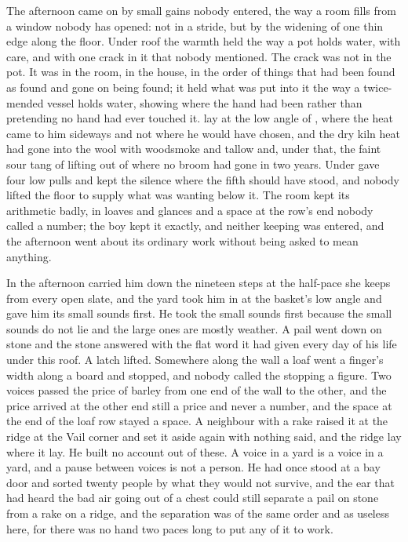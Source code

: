 The afternoon came on by small gains nobody entered, the way a room fills from a window nobody has opened: not in a stride, but by the widening of one thin edge along the floor. Under  roof the warmth held the way a pot holds water, with care, and with one crack in it that nobody mentioned. The crack was not in the pot. It was in the room, in the house, in the order of things that had been found as found and gone on being found; it held what was put into it the way a twice-mended vessel holds water, showing where the hand had been rather than pretending no hand had ever touched it.  lay at the low angle of , where the heat came to him sideways and not where he would have chosen, and the dry kiln heat had gone into the wool with woodsmoke and tallow and, under that, the faint sour tang of  lifting out of  where no broom had gone in two years. Under   gave four low pulls and kept the silence where the fifth should have stood, and nobody lifted the floor to supply what was wanting below it. The room kept its arithmetic badly, in loaves and glances and a space at the row's end nobody called a number; the boy kept it exactly, and neither keeping was entered, and the afternoon went about its ordinary work without being asked to mean anything.

In the afternoon  carried him down the nineteen steps at the half-pace she keeps from every open slate, and the yard took him in at the basket's low angle and gave him its small sounds first. He took the small sounds first because the small sounds do not lie and the large ones are mostly weather. A pail went down on stone and the stone answered with the flat word it had given every day of his life under this roof. A latch lifted. Somewhere along the wall a loaf went a finger's width along a board and stopped, and nobody called the stopping a figure. Two voices passed the price of barley from one end of the wall to the other, and the price arrived at the other end still a price and never a number, and the space at the end of the loaf row stayed a space. A neighbour with a rake raised it at the ridge at the Vail corner and set it aside again with nothing said, and the ridge lay where it lay. He built no account out of these. A voice in a yard is a voice in a yard, and a pause between voices is not a person. He had once stood at a bay door and sorted twenty people by what they would not survive, and the ear that had heard the bad air going out of a chest could still separate a pail on stone from a rake on a ridge, and the separation was of the same order and as useless here, for there was no hand two paces long to put any of it to work.

